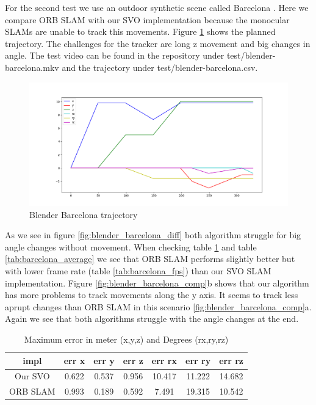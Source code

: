 \documentclass[11pt,a4paper,titlepage,oneside]{report}
\begin{document}
For the second test we use an outdoor synthetic scene called Barcelona \cite{blender}. Here we compare ORB SLAM with our SVO implementation because the monocular SLAMs are unable to track this movements. Figure \ref{fig:blender_barcelona_traj} shows the planned trajectory. The challenges for the tracker are long z movement and big changes in angle. The test video can be found in the repository under test/blender-barcelona.mkv and the trajectory under test/blender-barcelona.csv.

\begin{figure}[H]
  \includegraphics[width=1.0\textwidth]{img/blender_barcelona_traj.png}
  \caption{Blender Barcelona trajectory}\label{fig:blender_barcelona_traj}
\end{figure}

As we see in figure \ref{fig:blender_barcelona_diff} both algorithm struggle for big angle changes without movement. When checking table \ref{tab:barcelona_maximas} and table \ref{tab:barcelona_average} we see that ORB SLAM performs slightly better but with lower frame rate (table \ref{tab:barcelona_fps}) than our SVO SLAM implementation. Figure \ref{fig:blender_barcelona_comp}b shows that our algorithm has more problems to track movements along the y axis. It seems to track less aprupt changes than ORB SLAM in this scenario \ref{fig:blender_barcelona_comp}a. Again we see that both algorithms struggle with the angle changes at the end.

\begin{table}[H]
  \centering
  \begin{tabular}{|c|c|c|c|c|c|c|}
  impl & err x & err y & err z & err rx & err ry & err rz\\
  \hline
  Our SVO & 0.622 & 0.537 & 0.956 & 10.417 & 11.222 & 14.682\\
  ORB SLAM& 0.993 & 0.189 & 0.592 & 7.491 & 19.315 & 10.542
\end{tabular}
\caption{Maximum error in meter (x,y,z) and Degrees (rx,ry,rz)}
\label{tab:barcelona_maximas}
\end{table}
\end{document}
